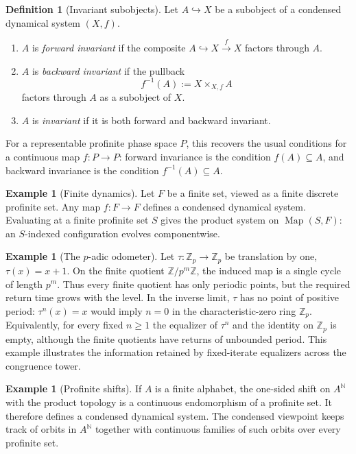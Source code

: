 \documentclass[10pt]{amsart}
\newcommand{\Z}{\mathbb{Z}}
\newcommand{\N}{\mathbb{N}}
\newcommand{\Zp}{\mathbb{Z}_p}
\theoremstyle{plain}
\theoremstyle{definition}
\newtheorem{definition}[theorem]{Definition}
\newtheorem{example}[theorem]{Example}
\begin{document}
\begin{definition}[Invariant subobjects]
\label{def:invariance}
Let $A\hookrightarrow X$ be a subobject of a condensed dynamical system
$(X,f)$.
\begin{enumerate}[label=(\alph*)]
\item $A$ is \emph{forward invariant} if the composite
$A\hookrightarrow X\xrightarrow{f}X$ factors through $A$.
\item $A$ is \emph{backward invariant} if the pullback
\[
  f^{-1}(A):=X\times_{X,f}A
\]
factors through $A$ as a subobject of $X$.
\item $A$ is \emph{invariant} if it is both forward and backward invariant.
\end{enumerate}
\end{definition}

For a representable profinite phase space $P$, this recovers the usual
conditions for a continuous map $f:P\to P$: forward invariance is the condition
$f(A)\subseteq A$, and backward invariance is the condition
$f^{-1}(A)\subseteq A$.

\begin{example}[Finite dynamics]
Let $F$ be a finite set, viewed as a finite discrete profinite set. Any map
$f:F\to F$ defines a condensed dynamical system. Evaluating at a finite profinite set
$S$ gives the product system on $\operatorname{Map}(S,F)$: an $S$-indexed
configuration evolves componentwise.
\end{example}

\begin{example}[The $p$-adic odometer]
Let $\tau:\Zp\to\Zp$ be translation by one, $\tau(x)=x+1$. On the finite
quotient $\Z/p^m\Z$, the induced map is a single cycle of length $p^m$. Thus
every finite quotient has only periodic points, but the required return time
grows with the level. In the inverse limit, $\tau$ has no point of positive
period: $\tau^n(x)=x$ would imply $n=0$ in the characteristic-zero ring $\Zp$.
Equivalently, for every fixed $n\ge 1$ the equalizer of $\tau^n$ and the identity
on $\Zp$ is empty, although the finite quotients have returns of unbounded
period. This example illustrates the information retained by fixed-iterate
equalizers across the congruence tower.
\end{example}

\begin{example}[Profinite shifts]
If $A$ is a finite alphabet, the one-sided shift on $A^{\N}$ with the product
topology is a continuous endomorphism of a profinite set. It therefore defines
a condensed dynamical system. The condensed viewpoint keeps track of orbits in
$A^\N$ together with continuous families of such orbits over every profinite set.
\end{example}
\end{document}
